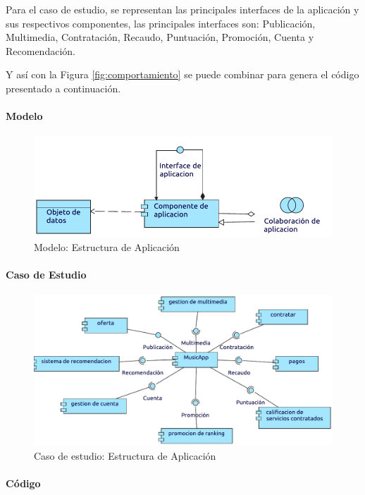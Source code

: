 Para el caso de estudio, se representan las principales interfaces de la aplicación y sus respectivos componentes, las principales interfaces son: Publicación, Multimedia, Contratación, Recaudo, Puntuación, Promoción, Cuenta y Recomendación. \vspace{\baselineskip}

Y así con la Figura \ref{fig:comportamiento} se puede combinar para genera el código presentado a continuación.
\paragraph{Modelo}
\begin{figure}[h!]
	\centering
	\includegraphics[width=\linewidth]{Desarrollo/ArquitecturaEmpresarial/Aplicacion/imgs/estructuraMetamodelo.pdf}
	\caption{Modelo: Estructura de Aplicación}
\end{figure}
\newpage
\paragraph{Caso de Estudio}

\begin{figure}[h!]
	\centering
	\includegraphics[width=\linewidth]{Desarrollo/ArquitecturaEmpresarial/Aplicacion/imgs/estructura.pdf}
	\caption{Caso de estudio: Estructura de Aplicación }
\end{figure}


\paragraph{Código}

